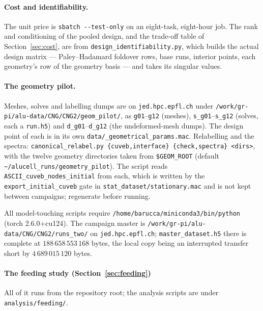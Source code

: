 \documentclass[11pt,a4paper]{article}
\theoremstyle{plain}
\theoremstyle{definition}
\theoremstyle{remark}
\begin{document}
\paragraph{Cost and identifiability.} The unit price is
\verb|sbatch --test-only| on an eight-task, eight-hour job. The rank and
conditioning of the pooled design, and the trade-off table of
Section~\ref{sec:cost}, are from \verb|design_identifiability.py|, which builds
the actual design matrix --- Paley--Hadamard foldover rows, base runs, interior
points, each geometry's row of the geometry basis --- and takes its singular
values.

\paragraph{The geometry pilot.} Meshes, solves and labelling dumps are on
\verb|jed.hpc.epfl.ch| under
\verb|/work/gr-pi/alu-data/CNG/CNG2/geom_pilot/|, as \verb|g01|--\verb|g12|
(meshes), \verb|s_g01|--\verb|s_g12| (solves, each a \verb|run.h5|) and
\verb|d_g01|--\verb|d_g12| (the undeformed-mesh dumps). The design point of each
is in its own \verb|data/_geometrical_params.mac|. Relabelling and the spectra:
\verb|canonical_relabel.py {cuveb,interface} {check,spectra} <dirs>|, with the
twelve geometry directories taken from \verb|$GEOM_ROOT| (default
\verb|~/alucell_runs/geometry_pilot|). The script reads
\verb|ASCII_cuveb_nodes_initial| from each, which is written by the
\verb|export_initial_cuveb| gate in \verb|stat_dataset/stationary.mac| and is not
kept between campaigns; regenerate before running.

\noindent
All model-touching scripts require \verb|/home/barucca/miniconda3/bin/python|
(torch 2.6.0+cu124). The campaign master is
\verb|/work/gr-pi/alu-data/CNG/CNG2/runs_two/| on \verb|jed.hpc.epfl.ch|;
\verb|master_dataset.h5| there is complete at $188\,658\,553\,168$ bytes, the
local copy being an interrupted transfer short by $4\,689\,015\,120$ bytes.



\paragraph{The feeding study (Section~\ref{sec:feeding})}
All of it runs from the repository root; the analysis scripts are under
\verb|analysis/feeding/|.
\end{document}
